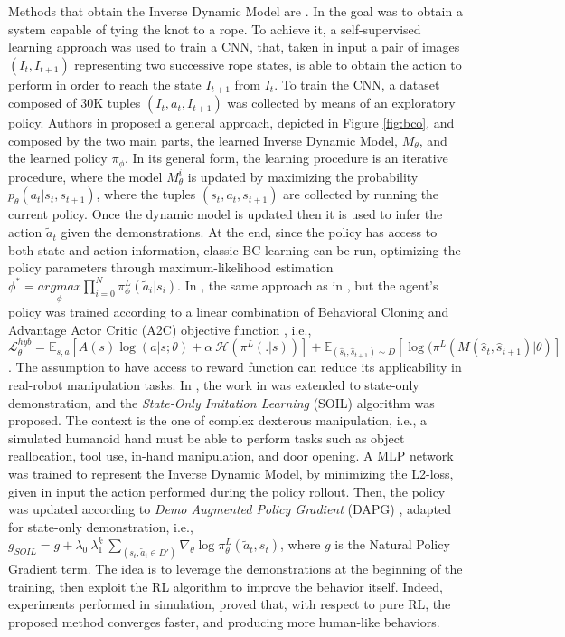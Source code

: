 \newline Methods that obtain  the Inverse Dynamic Model are \cite{nair2017combining,torabi2018bco,guo2019hybrid_rl,radosavovic2021state_only_demo}. In \cite{nair2017combining} the goal was to obtain a system capable of tying the knot to a rope. To achieve it, a self-supervised learning approach was used to train a CNN, that, taken in input a pair of images $(I_{t}, I_{t+1})$ representing two successive rope states, is able to obtain the action to perform in order to reach the state $I_{t+1}$ from $I_{t}$. To train the CNN, a dataset composed of 30K tuples $(I_{t},a_{t},I_{t+1})$ was collected by means of an exploratory policy. Authors in \cite{torabi2018bco} proposed a general approach, depicted in Figure \ref{fig:bco}, and composed by the two main parts, the learned Inverse Dynamic Model, $M_{\theta}$, and the learned policy $\pi_{\phi}$. In its general form, the learning procedure is an iterative procedure, where the model $M_{\theta}^{i}$ is updated by maximizing the probability $p_{\theta}(a_{t}|s_{t},s_{t+1})$, where the tuples $(s_{t},a_{t},s_{t+1})$ are collected by running the current policy. Once the dynamic model is updated then it is used to infer the action $\tilde{a}_{t}$ given the demonstrations. At the end, since the policy has access to both state and action information, classic BC learning can be run, optimizing the policy parameters through maximum-likelihood estimation $\phi^{*} = \underset{\phi}{argmax} \prod_{i=0}^{N} \pi^{L}_{\phi}(\tilde{a}_{i}|s_{i})$. In \cite{guo2019hybrid_rl}, the same approach as in \cite{torabi2018bco}, but the agent's policy was trained according to a linear combination of Behavioral Cloning and Advantage Actor Critic (A2C) objective function \cite{mnih2016a2c}, i.e., $\mathcal{L}^{hyb}_{\theta} = \mathbb{E}_{s,a}[A(s)\log(a|s;\theta)+\alpha \ \mathcal{H}(\pi^{L}(.|s))] + \mathbb{E}_{(\hat{s}_{t},\hat{s}_{t+1})\sim D}[\log(\pi^{L}(M(\hat{s}_{t},\hat{s}_{t+1})|\theta)]$. The assumption to have access to reward function can reduce its applicability in real-robot manipulation tasks. In \cite{radosavovic2021state_only_demo}, the work in \cite{Rajeswaran18_learning_complex_dexterous} was extended to state-only demonstration, and the \textit{State-Only Imitation Learning} (SOIL) algorithm was proposed. The context is the one of complex dexterous manipulation, i.e., a simulated humanoid hand must be able to perform tasks such as object reallocation, tool use, in-hand manipulation, and door opening. A MLP network was trained to represent the Inverse Dynamic Model, by minimizing the L2-loss, given in input the action performed during the policy rollout. Then, the policy was updated according to \textit{Demo Augmented Policy Gradient} (DAPG) \cite{Rajeswaran18_learning_complex_dexterous}, adapted for state-only demonstration, i.e., $g_{SOIL} = g + \lambda_{0} \ \lambda_{1}^{k} \ \sum_{(s_{t},\tilde{a}_{t} \in D')} \nabla_{\theta}\log\pi^{L}_{\theta}(\tilde{a}_{t},s_{t})$, where $g$ is the Natural Policy Gradient term. The idea is to leverage the demonstrations at the beginning of the training, then exploit the RL algorithm to improve the behavior itself. Indeed, experiments performed in simulation, proved that, with respect to pure RL, the proposed method converges faster, and producing more human-like behaviors.
